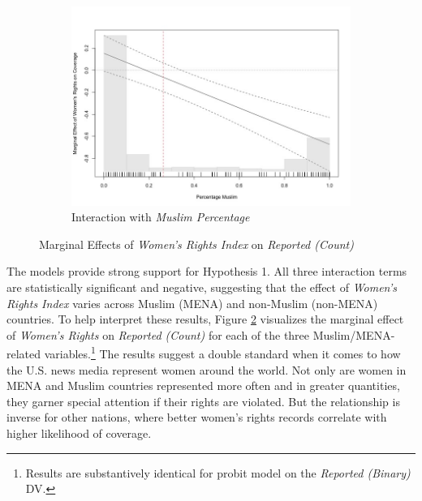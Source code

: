 \documentclass[11pt, oneside]{article}
\begin{document}
\begin{figure}
\begin{subfigure}{.5\textwidth}
  \includegraphics[width=1\linewidth]{nb3}
    \caption{Interaction with \emph{Muslim Percentage}}
  \label{fig:sfig2}
\end{subfigure}
\vspace{.5cm}
\caption{Marginal Effects of \emph{Women's Rights Index} on \emph{Reported (Count)}}
\label{fig:interactions}
\end{figure}

The models provide strong support for Hypothesis 1. All three interaction terms are statistically significant and negative, suggesting that the effect of \emph{Women's Rights Index} varies across Muslim (MENA) and non-Muslim (non-MENA) countries. To help interpret these results, Figure \ref{fig:interactions} visualizes the marginal effect of \emph{Women's Rights} on \emph{Reported (Count)} for each of the three Muslim/MENA-related variables.\footnote{\hspace{5}Results are substantively identical for probit model on the \emph{Reported (Binary)} DV.} The results suggest a double standard when it comes to how the U.S. news media represent women around the world. Not only are women in MENA and Muslim countries represented more often and in greater quantities, they garner special attention if their rights are violated. But the relationship is inverse for other nations, where better women's rights records correlate with higher likelihood of coverage. 
\end{document}
